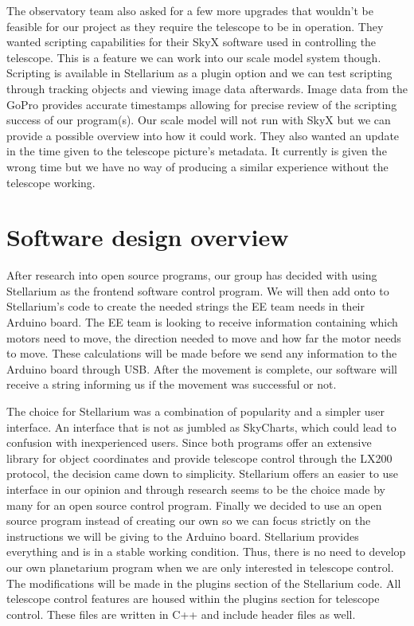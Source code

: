 \documentclass[12pt]{report}
\begin{document}
The observatory team also asked for a few more upgrades that wouldn’t be feasible for our project as they require the telescope to be in operation. They wanted scripting capabilities for their SkyX software used in controlling the telescope. This is a feature we can work into our scale model system though. Scripting is available in Stellarium as a plugin option and we can test scripting through tracking objects and viewing image data afterwards. Image data from the GoPro provides accurate timestamps allowing for precise review of the scripting success of our program(s). Our scale model will not run with SkyX but we can provide a possible overview into how it could work. They also wanted an update in the time given to the telescope picture’s metadata. It currently is given the wrong time but we have no way of producing a similar experience without the telescope working.

\section*{Software design overview}

After research into open source programs, our group has decided with using Stellarium as the frontend software control program. We will then add onto to Stellarium’s code to create the needed strings the EE team needs in their Arduino board. The EE team is looking to receive information containing which motors need to move, the direction needed to move and how far the motor needs to move. These calculations will be made before we send any information to the Arduino board through USB. After the movement is complete, our software will receive a string informing us if the movement was successful or not.

The choice for Stellarium was a combination of popularity and a simpler user interface. An interface that is not as jumbled as SkyCharts, which could lead to confusion with inexperienced users. Since both programs offer an extensive library for object coordinates and provide telescope control through the LX200 protocol, the decision came down to simplicity. Stellarium offers an easier to use interface in our opinion and through research seems to be the choice made by many for an open source control program. Finally we decided to use an open source program instead of creating our own so we can focus strictly on the instructions we will be giving to the Arduino board. Stellarium provides everything and is in a stable working condition. Thus, there is no need to develop our own planetarium program when we are only interested in telescope control. The modifications will be made in the plugins section of the Stellarium code. All telescope control features are housed within the plugins section for telescope control. These files are written in C++ and include header files as well.
\end{document}
